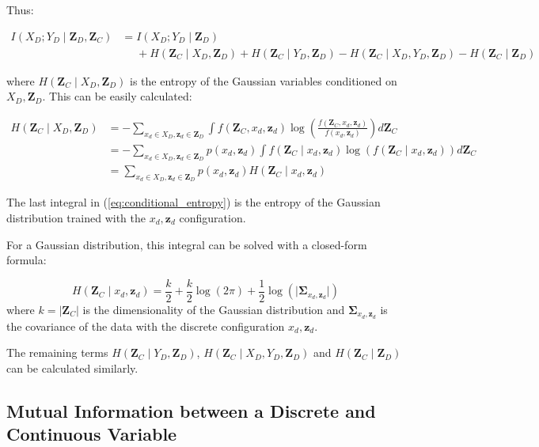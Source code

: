 \documentclass[12pt]{article}
\newcommand{\zd}{\mathbf{Z}_D}
\newcommand{\zc}{\mathbf{Z}_C}
\newcommand{\z}{\mathbf{Z}_D, \mathbf{Z}_C}
\begin{document}
Thus:

\begin{equation}
\begin{aligned}
I(X_D; Y_D \mid \z) & = I(X_D; Y_D \mid \zd)\\
&\phantom{=}{} + H(\zc \mid X_D, \zd) + H(\zc\mid Y_D, \zd) - H(\zc \mid X_D, Y_D, \zd) - H(\zc \mid \zd)
\end{aligned}
\end{equation}

where $H(\zc \mid X_D, \zd)$ is the entropy of the Gaussian variables conditioned on $X_D, \zd$. This can be easily calculated:

\begin{equation}
\begin{aligned}
H(\zc \mid X_D, \zd) & = - \sum\limits_{x_d \in X_D, \mathbf{z}_d \in \zd} \int f(\zc, x_d, \mathbf{z}_d)\log\left(\frac{f(\zc, x_d, \mathbf{z}_d)}{f(x_d, \mathbf{z}_d)}\right)d\zc\\
& = - \sum\limits_{x_d \in X_D, \mathbf{z}_d \in \zd} p(x_d, \mathbf{z}_d) \int f(\zc \mid x_d, \mathbf{z}_d)\log\left(f(\zc \mid x_d, \mathbf{z}_d)\right)d\zc\\
& = \sum\limits_{x_d \in X_D, \mathbf{z}_d \in \zd} p(x_d, \mathbf{z}_d) H(\zc \mid x_d, \mathbf{z}_d)
\end{aligned}
\label{eq:conditional_entropy}
\end{equation}

The last integral in (\ref{eq:conditional_entropy}) is the entropy of the Gaussian distribution trained with the $x_d, \mathbf{z}_d$ configuration.

For a Gaussian distribution, this integral can be solved with a closed-form formula:

\begin{equation}
H(\zc \mid x_d, \mathbf{z}_d) = \frac{k}{2} + \frac{k}{2}\log(2\pi) + \frac{1}{2}\log(\lvert\boldsymbol{\Sigma}_{x_d, \mathbf{z}_d}\rvert)
\end{equation}
where $k = \lvert\zc\rvert$ is the dimensionality of the Gaussian distribution and $\boldsymbol{\Sigma}_{x_d, \mathbf{z}_d}$ is the covariance of the data with the discrete configuration $x_d, \mathbf{z}_d$.

The remaining terms $H(\zc \mid Y_D, \zd)$, $H(\zc \mid X_D, Y_D, \zd)$ and $H(\zc \mid \zd)$ can be calculated similarly.

\subsection{Mutual Information between a Discrete and Continuous Variable}
\end{document}
